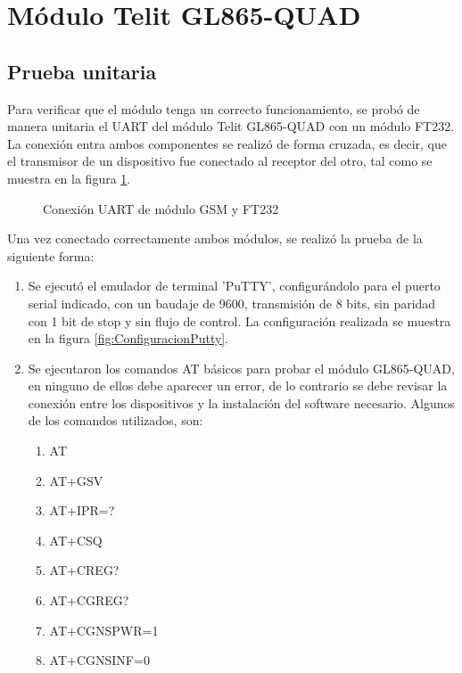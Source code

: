 \section{Módulo Telit GL865-QUAD}
\subsection{Prueba unitaria}
Para verificar que el módulo tenga un correcto funcionamiento, se probó de manera unitaria el UART del módulo Telit GL865-QUAD con un módulo FT232. La conexión entra ambos componentes se realizó de forma cruzada, es decir, que el transmisor de un dispositivo fue conectado al receptor del otro, tal como se muestra en la figura \ref{fig:ConexionUART}.

	\begin{figure}[htbp!]
		\centering
		\caption{Conexión UART de módulo GSM y FT232}
		\label{fig:ConexionUART}
	\end{figure}
	
Una vez conectado correctamente ambos módulos, se realizó la prueba de la siguiente forma:
\begin{enumerate}
	\item Se ejecutó el emulador de terminal ’PuTTY’, configurándolo para el puerto serial
	indicado, con un baudaje de 9600, transmisión de 8 bits, sin paridad con 1 bit de
	stop y sin flujo de control. La configuración realizada se muestra en la figura \ref{fig:ConfiguracionPutty}.
	\item Se ejecutaron los comandos AT básicos para probar el módulo GL865-QUAD, en ninguno de ellos
	debe aparecer un error, de lo contrario se debe revisar la conexión entre los dispositivos
	y la instalación del software necesario. Algunos de los comandos utilizados, son:
		\begin{enumerate}
			\item AT
			\item AT+GSV
			\item AT+IPR=?
			\item AT+CSQ
			\item AT+CREG? 
			\item AT+CGREG? 
			\item AT+CGNSPWR=1
			\item AT+CGNSINF=0
		\end{enumerate}	
\end{enumerate}
 
